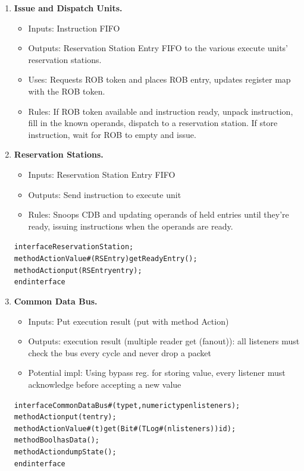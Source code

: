 \documentclass[12pt]{article}
\begin{document}
\begin{enumerate}
    \item \textbf{Issue and Dispatch Units.} 
    \begin{itemize}
        \item[] Inputs: Instruction FIFO
        \item[] Outputs: Reservation Station Entry FIFO to the various execute units' reservation stations.
        \item[] Uses: Requests ROB token and places ROB entry, updates register map with the ROB token.
        \item[] Rules: If ROB token available and instruction ready, unpack instruction, fill in the known operands, 
        dispatch to a reservation station. If store instruction, wait for ROB to empty and issue.
    \end{itemize}
    
    \item \textbf{Reservation Stations.}
    \begin{itemize}
        \item[] Inputs: Reservation Station Entry FIFO
        \item[] Outputs: Send instruction to execute unit
        \item[] Rules: Snoops CDB and updating operands of held entries until they're ready, issuing instructions when 
        the operands are ready.
    \end{itemize}
    \begin{alltt}
        interface ReservationStation;
          method ActionValue#(RSEntry) getReadyEntry();
          method Action put(RSEntry entry);
        endinterface
    \end{alltt}
    
    \item \textbf{Common Data Bus.}
    \begin{itemize}
        \item[] Inputs: Put execution result (put with method Action)
        \item[] Outputs: execution result (multiple reader get (fanout)): all listeners must check the bus every cycle and never drop a packet
        \item[] Potential impl: Using bypass reg. for storing value, every listener must acknowledge before accepting a new value
    \end{itemize}
    
    \begin{alltt}
        interface CommonDataBus#(type t, numeric type nlisteners);
          method Action put(t entry);
          method ActionValue#(t) get(Bit#(TLog#(nlisteners)) id);
          method Bool hasData();
          method Action dumpState();
        endinterface
    \end{alltt}
    

\end{enumerate}
\end{document}
